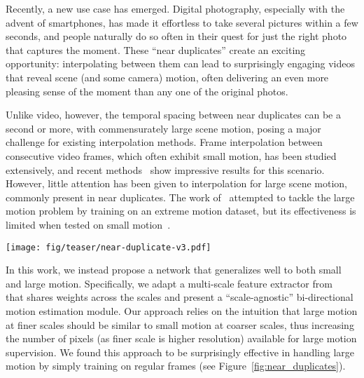 \documentclass[runningheads]{llncs}
\newcommand{\newedit}[1]{ {\color{cyan} {#1}}}
\newcommand{\newedit}[1]{{#1}}
\begin{document}
Recently, a new use case has emerged. Digital photography, especially with the advent of smartphones, has made it effortless to take several pictures within a few seconds, and people naturally do so often in their quest for just the right photo that captures the moment. These ``near duplicates'' create an exciting opportunity: interpolating between them can lead to surprisingly engaging videos that reveal scene (and some camera) motion, often delivering an even more pleasing sense of the moment than any one of the original photos. 

\newedit{Unlike video, however, the temporal spacing between near duplicates can be a second or more, with commensurately large scene motion, posing a major challenge for existing interpolation methods.
Frame interpolation between consecutive video frames, which often exhibit small motion, has been studied extensively, and recent methods~\cite{softsplat-2020,dain-2019,abme-2021,huang2020rife} show impressive results for this scenario. However, little attention has been given to interpolation for large scene motion, commonly present in near duplicates. The work of~\cite{eXVFI-2021} attempted to tackle the large motion problem by training on an extreme motion dataset, but its effectiveness is limited when tested on small motion~\cite{abme-2021}.}
\begin{figure*}[t!]
    \vspace{-1.5ex}
    \centering
    \texttt{[image: fig/teaser/near-duplicate-v3.pdf]}
    \caption{Near-duplicate photos interpolation with ABME~\cite{abme-2021}, showing large artifacts, and our FILM, showing improvements.}
    \label{fig:near_duplicates}
    \vspace{-4ex}
\end{figure*}


In this work, we instead propose a network that generalizes well to both small and large motion. Specifically, we adapt a multi-scale feature extractor from~\cite{fusion-2019} that shares weights across the scales and present a ``scale-agnostic'' bi-directional motion estimation module. Our approach relies on the intuition that large motion at finer scales should be similar to small motion at coarser scales, thus increasing the number of pixels (as finer scale is higher resolution) available for large motion supervision. We found this approach to be surprisingly effective in handling large motion by simply training on regular frames  (see Figure~\ref{fig:near_duplicates}).
\end{document}
